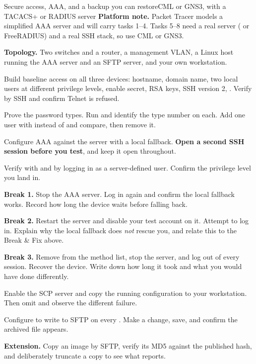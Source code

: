 \begin{lab}{Secure access, AAA, and a backup you can restore}{CML or GNS3, with a TACACS+ or RADIUS server}
\textbf{Platform note.} Packet Tracer models a simplified AAA server and will
carry tasks 1--4. Tasks 5--8 need a real server ( or FreeRADIUS)
and a real SSH stack, so use CML or GNS3.

\textbf{Topology.} Two switches and a router, a management VLAN, a Linux host
running the AAA server and an SFTP server, and your own workstation.

\begin{tasks}
  \item Build baseline access on all three devices: hostname, domain name, two
        local users at different privilege levels, enable secret, RSA keys, SSH
        version 2, . Verify by SSH and confirm Telnet is
        refused.
  \item Prove the password types. Run  and
        identify the type number on each. Add one user with
         instead of  and compare, then remove it.
  \item Configure AAA against the server with a local fallback. \textbf{Open a
        second SSH session before you test}, and keep it open throughout.
  \item Verify with  and by logging in as a server-defined
        user. Confirm the privilege level you land in.
  \item \textbf{Break 1.} Stop the AAA server. Log in again and confirm the local
        fallback works. Record how long the device waits before falling back.
  \item \textbf{Break 2.} Restart the server and disable your test account on it.
        Attempt to log in. Explain why the local fallback does \emph{not} rescue
        you, and relate this to the Break \& Fix above.
  \item \textbf{Break 3.} Remove  from the method list, stop the
        server, and log out of every session. Recover the device. Write down how
        long it took and what you would have done differently.
  \item Enable the SCP server and copy the running configuration to your
        workstation. Then omit  and observe the
        different failure.
  \item Configure  to write to SFTP on every .
        Make a change, save, and confirm the archived file appears.
  \item \textbf{Extension.} Copy an image by SFTP, verify its MD5 against the
        published hash, and deliberately truncate a copy to see what
         reports.
\end{tasks}
\end{lab}

